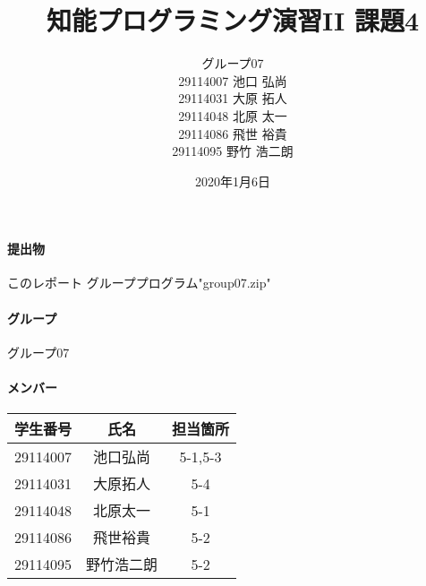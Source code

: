 \documentclass{jarticle}
\title{知能プログラミング演習II 課題4}
\author{グループ07\\
    29114007 池口 弘尚\\
    29114031 大原 拓人\\
    29114048 北原 太一\\
    29114086 飛世 裕貴\\
    29114095 野竹 浩二朗\\
}
\date{2020年1月6日}
\begin{document}
\maketitle

\paragraph{提出物} このレポート グループプログラム"group07.zip"
\paragraph{グループ} グループ07
\paragraph{メンバー}
\begin{tabular}{|c|c|c|}
    \hline
    学生番号&氏名&担当箇所\\
    \hline\hline
    29114007&池口弘尚&5-1,5-3\\
    \hline
    29114031&大原拓人&5-4\\
    \hline
    29114048&北原太一&5-1\\
    \hline
    29114086&飛世裕貴&5-2\\
    \hline
    29114095&野竹浩二朗&5-2\\
    \hline
\end{tabular}
\end{document}
